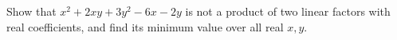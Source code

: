 Show that $x^2+2xy+3y^2-6x-2y$ is not a product of two linear factors with real coefficients, and find its minimum value over all real $x,y$.
